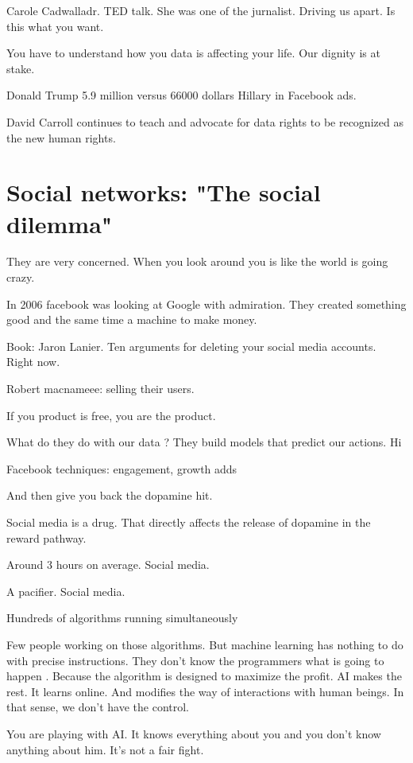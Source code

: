   Carole Cadwalladr. TED talk. She was one of the jurnalist. Driving us apart. Is this what you want. 
  
  You have to understand how you data is affecting your life. Our dignity is at stake. 
  
  Donald Trump 5.9 million versus 66000 dollars Hillary in Facebook ads. 
  
  David Carroll continues to teach and advocate for data rights to be recognized as the new human rights. 
  
  
 
       
 \section{Social networks: "The social dilemma"}
 They are very concerned. 
 When you look around you is like the world is going crazy. 
 
 In 2006 facebook was looking at Google with admiration. They created something good and the same time a machine to make money. 
 
 Book: Jaron Lanier. Ten arguments for deleting your social media accounts. Right now. 
 
 Robert macnameee: selling their users. 
 
 If you  product is free, you are the product. 
 
 What do they do with our data ? 
 They build models that predict our actions. Hi
 
 Facebook techniques: engagement, growth adds
 
 And then give you back the dopamine hit. 
 
 Social media is a drug. That directly affects the release of dopamine in the reward pathway. 
 
 Around 3 hours on average. Social media. 
 
 A pacifier. Social media. 
 
 Hundreds of algorithms running simultaneously 
 
 Few people working on those algorithms. But machine learning has nothing to do with precise  instructions. They don't know the programmers 
 what is going to happen . Because the algorithm is designed to maximize the profit. AI makes the rest. It learns online. And modifies the 
 way of interactions with human beings. In that sense, we don't have the control. 
 
 You are playing with AI. It knows everything about you and you don't know anything about him.  It's not a fair fight. 
 
